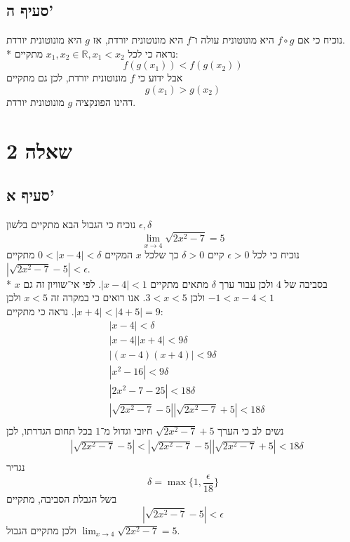 \documentclass[a4paper]{article}
\def\RR{\mathbb{R}}
\begin{document}
\subsection{סעיף ה'}
נוכיח כי אם $f \circ g$ היא מונוטונית עולה ו־$f$ היא מונוטונית יורדת,
אז $g$ היא מונוטונית יורדת. \\*
נראה כי לכל $x_1, x_2 \in \RR, x_1 < x_2$ מתקיים:
\[
	f(g(x_1)) < f(g(x_2))
\]
אבל ידוע כי $f$ מונוטונית יורדת, לכן גם מתקיים
\[
	g(x_1) > g(x_2)
\]
דהינו הפונקציה $g$ מונוטונית יורדת.

\section{שאלה 2}
\subsection{סעיף א'}
נוכיח כי הגבול הבא מתקיים בלשון $\epsilon, \delta$
\[
	\lim_{x \to 4} \sqrt{2x^2 - 7} = 5
\]
נוכיח כי לכל $\epsilon > 0$ קיים $\delta > 0$
כך שלכל $x$ המקיים $0 < |x - 4| < \delta$
מתקיים $|\sqrt{2x^2 - 7} - 5| < \epsilon$. \\*
$x$ בסביבה של $4$ ולכן עבור ערך $\delta$ מתאים מתקיים $|x - 4| < 1$.
לפי אי־שוויון זה גם $-1 < x - 4 < 1$ ולכן $3 < x < 5$.
אנו רואים כי במקרה זה $x < 5$ ולכן $|x + 4| < |4 + 5| = 9$.
נראה כי מתקיים:
\begin{align*}
	& |x - 4| < \delta \\
	& |x - 4| |x + 4| < 9\delta \\
	& |(x - 4)(x + 4)| < 9\delta \\
	& |x^2 - 16| < 9\delta \\
	& |2x^2 - 7 - 25| < 18\delta \\
	& |\sqrt{2x^2 - 7} - 5| |\sqrt{2x^2 - 7} + 5| < 18\delta \\
\end{align*}
נשים לב כי הערך $\sqrt{2x^2 - 7} + 5$ חיובי וגדול מ־$1$ בכל תחום הגדרתו,
לכן
\begin{align*}
	& |\sqrt{2x^2 - 7} - 5| 
	< |\sqrt{2x^2 - 7} - 5| |\sqrt{2x^2 - 7} + 5| < 18\delta \\
\end{align*}
נגדיר 
\[
	\delta = \max\{1, \frac{\epsilon}{18}\}
\]
בשל הגבלת הסביבה, מתקיים
\[
	|\sqrt{2x^2 - 7} - 5| < \epsilon
\]
ולכן מתקיים הגבול $\lim_{x \to 4} \sqrt{2x^2 - 7} = 5$.
\end{document}
